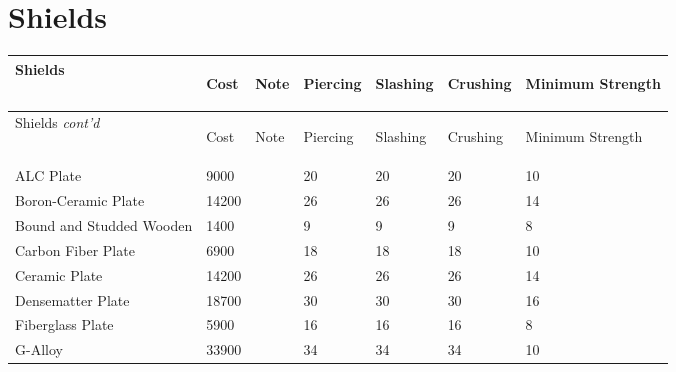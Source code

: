 \documentclass[twoside]{book}
\begin{document}
    

\section{Shields}
    
\begin{longtable}{p{1.25in}llp{3em}p{3em}p{3em}p{3em}} 
  Shields& \begin{turn}{70}{Cost}\end{turn}
          & \begin{turn}{70}{Note}\end{turn}
          & \begin{turn}{70}{Piercing}\end{turn}
          & \begin{turn}{70}{Slashing}\end{turn}
          & \begin{turn}{70}{Crushing}\end{turn}
          & \begin{turn}{70}{Minimum Strength}\end{turn}
          \\
  \hline
  \hline
  \endfirsthead
  Shields \textit{cont'd}
        & \begin{turn}{70}{Cost}\end{turn}
          & \begin{turn}{70}{Note}\end{turn}
          & \begin{turn}{70}{Piercing}\end{turn}
          & \begin{turn}{70}{Slashing}\end{turn}
          & \begin{turn}{70}{Crushing}\end{turn}
          & \begin{turn}{70}{Minimum Strength}\end{turn}
           \\
  \hline
  \endhead
\raggedright ALC Plate&9000&&20&20&20&10\tabularnewline
      \raggedright Boron-Ceramic Plate&14200&&26&26&26&14\tabularnewline
      \raggedright Bound and Studded Wooden&1400&&9&9&9&8\tabularnewline
      \raggedright Carbon Fiber Plate&6900&&18&18&18&10\tabularnewline
      \raggedright Ceramic Plate&14200&&26&26&26&14\tabularnewline
      \raggedright Densematter Plate&18700&&30&30&30&16\tabularnewline
      \raggedright Fiberglass Plate&5900&&16&16&16&8\tabularnewline
      \raggedright G-Alloy&33900&&34&34&34&10\tabularnewline

\end{longtable}
\end{document}
